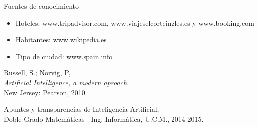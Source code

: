 \documentclass[11pt, a4paper, spanish, openright, twoside]{book}
\begin{document}
	\begin{section}{Fuentes de conocimiento}
		\begin{itemize}
			\item Hoteles: www.tripadvisor.com, www.viajeselcorteingles.es y www.booking.com
			\item Habitantes: www.wikipedia.es
			\item Tipo de ciudad: www.spain.info 
	\end{itemize}
		

	\end{section}

	
\begin{thebibliography}{9}

	Russell, S.; Norvig, P, \\
	\emph{Artificial Intelligence, a modern aproach}.\\
	New Jersey: Pearson, 2010.
	
	Apuntes y transparencias de Inteligencia Artificial, \\
	Doble Grado Matemáticas - Ing. Informática, U.C.M., 2014-2015.

\end{thebibliography}
\end{document}
